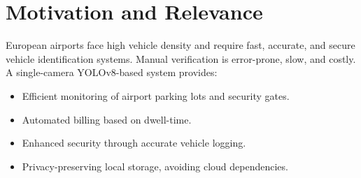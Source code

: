 	
	
	\section{Motivation and Relevance}
	European airports face high vehicle density and require fast, accurate, and secure vehicle identification systems. Manual verification is error-prone, slow, and costly. A single-camera YOLOv8-based system provides:
	\begin{itemize}
		\item Efficient monitoring of airport parking lots and security gates.
		\item Automated billing based on dwell-time.
		\item Enhanced security through accurate vehicle logging.
		\item Privacy-preserving local storage, avoiding cloud dependencies.
	\end{itemize}
	
